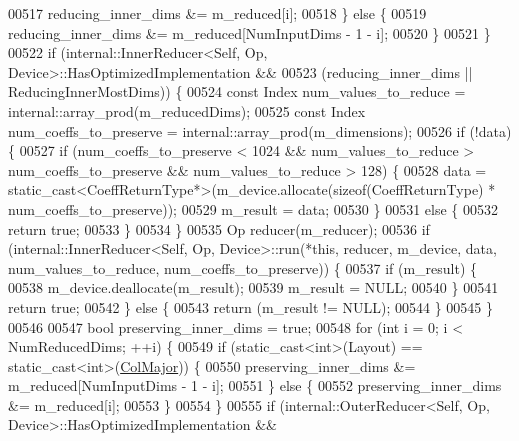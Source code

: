 \begin{DoxyCode}
00517           reducing\_inner\_dims &= m\_reduced[i];
00518         \} \textcolor{keywordflow}{else} \{
00519           reducing\_inner\_dims &= m\_reduced[NumInputDims - 1 - i];
00520         \}
00521       \}
00522       \textcolor{keywordflow}{if} (internal::InnerReducer<Self, Op, Device>::HasOptimizedImplementation &&
00523           (reducing\_inner\_dims || ReducingInnerMostDims)) \{
00524         \textcolor{keyword}{const} Index num\_values\_to\_reduce = internal::array\_prod(m\_reducedDims);
00525         \textcolor{keyword}{const} Index num\_coeffs\_to\_preserve = internal::array\_prod(m\_dimensions);
00526         \textcolor{keywordflow}{if} (!data) \{
00527           \textcolor{keywordflow}{if} (num\_coeffs\_to\_preserve < 1024 && num\_values\_to\_reduce > num\_coeffs\_to\_preserve && 
      num\_values\_to\_reduce > 128) \{
00528             data = \textcolor{keyword}{static\_cast<}CoeffReturnType*\textcolor{keyword}{>}(m\_device.allocate(\textcolor{keyword}{sizeof}(CoeffReturnType) * 
      num\_coeffs\_to\_preserve));
00529             m\_result = data;
00530           \}
00531           \textcolor{keywordflow}{else} \{
00532             \textcolor{keywordflow}{return} \textcolor{keyword}{true};
00533           \}
00534         \}
00535         Op reducer(m\_reducer);
00536         \textcolor{keywordflow}{if} (internal::InnerReducer<Self, Op, Device>::run(*\textcolor{keyword}{this}, reducer, m\_device, data, 
      num\_values\_to\_reduce, num\_coeffs\_to\_preserve)) \{
00537           \textcolor{keywordflow}{if} (m\_result) \{
00538             m\_device.deallocate(m\_result);
00539             m\_result = NULL;
00540           \}
00541           \textcolor{keywordflow}{return} \textcolor{keyword}{true};
00542         \} \textcolor{keywordflow}{else} \{
00543           \textcolor{keywordflow}{return} (m\_result != NULL);
00544         \}
00545       \}
00546 
00547       \textcolor{keywordtype}{bool} preserving\_inner\_dims = \textcolor{keyword}{true};
00548       \textcolor{keywordflow}{for} (\textcolor{keywordtype}{int} i = 0; i < NumReducedDims; ++i) \{
00549         \textcolor{keywordflow}{if} (static\_cast<int>(Layout) == static\_cast<int>(\hyperlink{group__enums_ggaacded1a18ae58b0f554751f6cdf9eb13a0cbd4bdd0abcfc0224c5fcb5e4f6669a}{ColMajor})) \{
00550           preserving\_inner\_dims &= m\_reduced[NumInputDims - 1 - i];
00551         \} \textcolor{keywordflow}{else} \{
00552           preserving\_inner\_dims &= m\_reduced[i];
00553         \}
00554       \}
00555       \textcolor{keywordflow}{if} (internal::OuterReducer<Self, Op, Device>::HasOptimizedImplementation &&

\end{DoxyCode}
